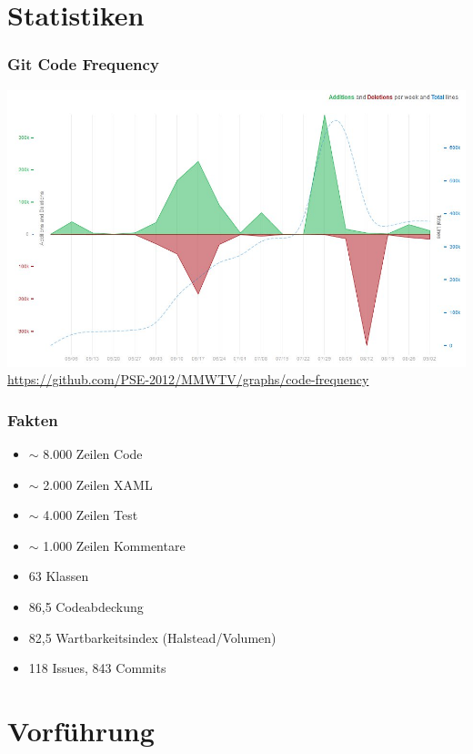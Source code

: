 \documentclass[t]{beamer}
\begin{document}
\section{Statistiken}
\begin{frame}
	\frametitle{Git Code Frequency}
	\includegraphics[scale=.33]{img/GitCodeFrequency.jpg}\\
	\hyperlink{Git Code Frequency}{https://github.com/PSE-2012/MMWTV/graphs/code-frequency}
\end{frame}
\begin{frame}
	\frametitle{Fakten}
	\begin{itemize}
	\item <+-> \begin{math}\sim	\end{math} 8.000 Zeilen Code
	\item <+-> \begin{math}\sim \end{math} 2.000 Zeilen XAML
	\item <+-> \begin{math}\sim	\end{math} 4.000 Zeilen Test
	\item <+-> \begin{math}\sim \end{math} 1.000 Zeilen Kommentare
	\item <+-> 63 Klassen
	\item <+-> 86,5 Codeabdeckung
	\item <+-> 82,5 Wartbarkeitsindex (Halstead/Volumen)
	\item <+-> 118 Issues, 843 Commits 
	\end{itemize}
\end{frame}
\section{Vorführung}
\end{document}
